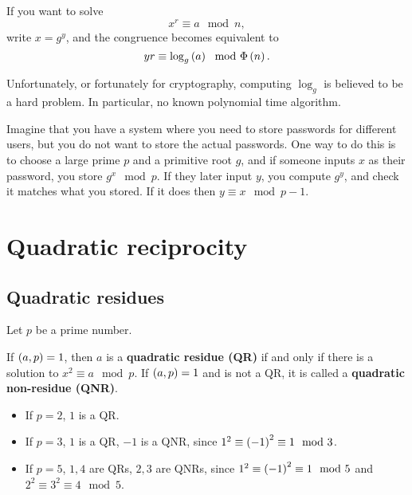 \begin{example2}
If you want to solve
$$ x^r \equiv a \mod n, $$
write $ x = g^y $, and the congruence becomes equivalent to
$$ yr \equiv \log_g\left( a \right) \mod \Phi\left( n \right). $$
\end{example2}

Unfortunately, or fortunately for cryptography, computing $ \log_g $ is believed to be a hard problem. In particular, no known polynomial time algorithm.

\begin{example2}
Imagine that you have a system where you need to store passwords for different users, but you do not want to store the actual passwords. One way to do this is to choose a large prime $ p $ and a primitive root $ g $, and if someone inputs $ x $ as their password, you store $ g^x \mod p $. If they later input $ y $, you compute $ g^y $, and check it matches what you stored. If it does then $ y \equiv x \mod p - 1 $.
\end{example2}

\pagebreak

\section{Quadratic reciprocity}

\subsection{Quadratic residues}

Let $ p $ be a prime number.

\begin{definition}
If $ \left( a, p \right) = 1 $, then $ a $ is a \textbf{quadratic residue (QR)} if and only if there is a solution to $ x^2 \equiv a \mod p $. If $ \left( a, p \right) = 1 $ and is not a QR, it is called a \textbf{quadratic non-residue (QNR)}.
\end{definition}

\begin{example2}
\hfill
\begin{itemize}
\item If $ p = 2 $, $ 1 $ is a QR.
\item If $ p = 3 $, $ 1 $ is a QR, $ -1 $ is a QNR, since $ 1^2 \equiv \left( -1 \right)^2 \equiv 1 \mod 3 $.
\item If $ p = 5 $, $ 1, 4 $ are QRs, $ 2, 3 $ are QNRs, since $ 1^2 \equiv \left( -1 \right)^2 \equiv 1 \mod 5 $ and $ 2^2 \equiv 3^2 \equiv 4 \mod 5 $.
\end{itemize}
\end{example2}

